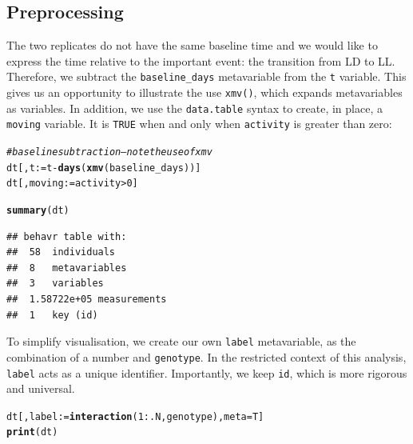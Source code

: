 \documentclass[10pt,letterpaper]{article}\usepackage[]{graphicx}\usepackage[]{color}
\makeatletter
\newcommand{\hlnum}[1]{\textcolor[rgb]{0.686,0.059,0.569}{#1}}%
\newcommand{\hlcom}[1]{\textcolor[rgb]{0.678,0.584,0.686}{\textit{#1}}}%
\newcommand{\hlopt}[1]{\textcolor[rgb]{0,0,0}{#1}}%
\newcommand{\hlstd}[1]{\textcolor[rgb]{0.345,0.345,0.345}{#1}}%
\newcommand{\hlkwb}[1]{\textcolor[rgb]{0.69,0.353,0.396}{#1}}%
\newcommand{\hlkwc}[1]{\textcolor[rgb]{0.333,0.667,0.333}{#1}}%
\newcommand{\hlkwd}[1]{\textcolor[rgb]{0.737,0.353,0.396}{\textbf{#1}}}%
\newenvironment{kframe}{%
 \def\at@end@of@kframe{}%
 \ifinner\ifhmode%
  \def\at@end@of@kframe{\end{minipage}}%
  \begin{minipage}{\columnwidth}%
 \fi\fi%
 \def\FrameCommand##1{\hskip\@totalleftmargin \hskip-\fboxsep
 \colorbox{shadecolor}{##1}\hskip-\fboxsep
     \hskip-\linewidth \hskip-\@totalleftmargin \hskip\columnwidth}%
 \MakeFramed {\advance\hsize-\width
   \@totalleftmargin\z@ \linewidth\hsize
   \@setminipage}}%
 {\par\unskip\endMakeFramed%
 \at@end@of@kframe}
\newenvironment{knitrout}{}{} %
\makeatother
\begin{document}
\subsection*{Preprocessing}
The two replicates do not have the same baseline time and we would like to express the time relative to the important event:
the transition from LD to LL. 
Therefore, we subtract the \texttt{baseline\_days} metavariable from the \texttt{t} variable.
This gives us an opportunity to illustrate the use \texttt{xmv()}, which expands metavariables as variables.
In addition, we use the \texttt{data.table} syntax to create, in place, a \texttt{moving} variable.
It is \texttt{TRUE} when and only when \texttt{activity} is greater than zero:

\begin{knitrout}
\color{fgcolor}\begin{kframe}
\begin{alltt}
\hlcom{# baseline subtraction -- note the use of xmv}
\hlstd{dt[,t} \hlkwb{:=} \hlstd{t} \hlopt{-} \hlkwd{days}\hlstd{(}\hlkwd{xmv}\hlstd{(baseline_days))]}
\hlstd{dt[, moving} \hlkwb{:=}  \hlstd{activity} \hlopt{>} \hlnum{0}\hlstd{]}
\end{alltt}
\end{kframe}
\end{knitrout}

\begin{knitrout}
\color{fgcolor}\begin{kframe}
\begin{alltt}
\hlkwd{summary}\hlstd{(dt)}
\end{alltt}
\begin{verbatim}
## behavr table with:
##  58	individuals
##  8	metavariables
##  3	variables
##  1.58722e+05	measurements
##  1	key (id)
\end{verbatim}
\end{kframe}
\end{knitrout}

To simplify visualisation, we create our own \texttt{label} metavariable, as the combination of a number and \texttt{genotype}.
In the restricted context of this analysis, \texttt{label} acts as a unique identifier.
Importantly, we keep \texttt{id}, which is more rigorous and universal.



\begin{knitrout}
\color{fgcolor}\begin{kframe}
\begin{alltt}
\hlstd{dt[, label} \hlkwb{:=} \hlkwd{interaction}\hlstd{(}\hlnum{1}\hlopt{:}\hlstd{.N, genotype),} \hlkwc{meta} \hlstd{= T]}
\hlkwd{print}\hlstd{(dt)}
\end{alltt}
\end{kframe}
\end{knitrout}
\end{document}
